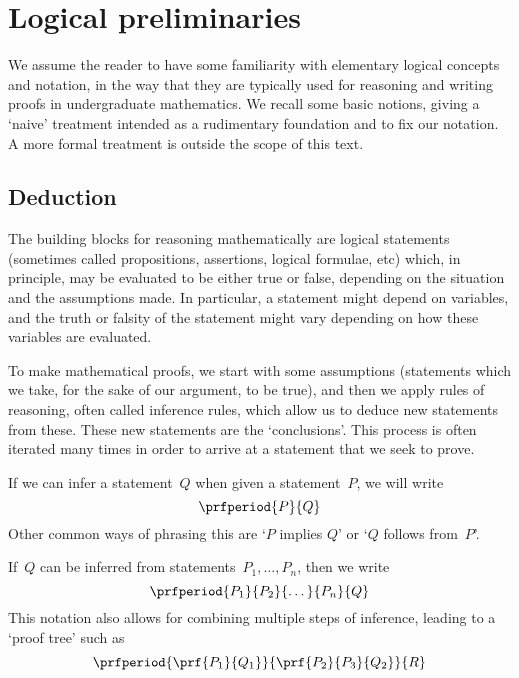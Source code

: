 
\section{Logical preliminaries}
\label{sec:logical-prelim}

We assume the reader to have some familiarity with elementary logical concepts and notation, in the way that they are typically used for reasoning and writing proofs in undergraduate mathematics.
We recall some basic notions, giving a `naive' treatment intended as a rudimentary foundation and to fix our notation.
A more formal treatment is outside the scope of this text.


\subsection{Deduction}

The building blocks for reasoning mathematically are logical statements (sometimes called propositions, assertions, logical formulae, etc) which, in principle, may be evaluated to be either true or false, depending on the situation and the assumptions made.
In particular, a statement might depend on variables, and the truth or falsity of the statement might vary depending on how these variables are evaluated.

To make mathematical proofs, we start with some assumptions (statements which we take, for the sake of our argument, to be true), and then we apply rules of reasoning, often called inference rules, which allow us to deduce new statements from these.
These new statements are the `conclusions'.
This process is often iterated many times in order to arrive at a statement that we seek to prove.

If we can infer a statement~$Q$ when given a statement~$P$, we will write
\begin{equation*}
    \prfperiod
    {P}{Q}
\end{equation*}
Other common ways of phrasing this are `$P$ implies $Q$' or `$Q$ follows from~$P$'.

If~$Q$ can be inferred from statements~$P_1, \ldots, P_n$, then we write
\begin{equation*}
    \prfperiod{
        P_1}{P_2}{\dots}{P_n}{Q}
\end{equation*}
This notation also allows for combining multiple steps of inference, leading to a `proof tree' such as
\begin{equation*}
    \prfperiod
    {\prf{P_1}{Q_1}}{\prf{P_2}{P_3}{Q_2}}{R}
\end{equation*}

